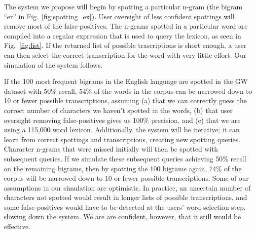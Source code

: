 \documentclass[conference]{IEEEtran}
\begin{document}

The system we propose will begin by spotting a particular n-gram (the bigram ``er'' in Fig.~\ref{fig:spotting_ex}). 
User oversight of less confident spottings will remove most of the false-positives. 
The n-grams spotted in a particular word are compiled into a regular expression that is used to query the lexicon, as seen in Fig.~\ref{fig:list}. 
If the returned list of possible trascriptions is short enough, a user can then select the correct transcription for the word with very little effort. 
Our simulation of the system follows.

If the 100 most frequent bigrams in the English language are spotted in the GW dataset with 50\% recall, 54\% of the words in the corpus can be narrowed down to 10 or fewer possible transcriptions, assuming (a) that we can correctly guess the correct number of characters we haven't spotted in the words, (b) that user oversight removing false-positives gives us 100\% precision, and (c) that we are using a 115,000 word lexicon. 
Additionally, the system will be iterative; it can learn from correct spottings and transcriptions, creating new spotting queries. Character n-grams that were missed initially will then be spotted with subsequent queries. 
If we simulate these subsequent queries achieving 50\% recall on the remaining bigrams, then by spotting the 100 bigrams again, 74\% of the corpus will be narrowed down to 10 or fewer possible transcriptions.
Some of our assumptions in our simulation are optimistic. In practice, an uncertain number of characters not spotted would result in longer lists of possible transcriptions, and some false-positives would have to be detected at the users' word-selection step, slowing down the system. We are are confident, however, that it still would be effective.
\end{document}
